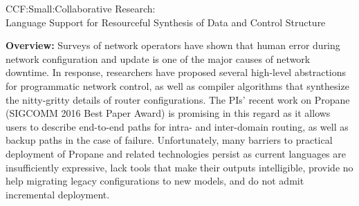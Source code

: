 \documentclass[12pt]{article}
\makeatletter
\newcommand{\Propane}{{\sc Propane}\@\xspace}
\makeatother
\begin{document}
\setcounter{page}{1}

 \begin{large}
\begin{center}
CCF:Small:Collaborative Research: \\
Language Support for Resourceful Synthesis of Data and Control Structure
\end{center}
\end{large}

\noindent
\textbf{Overview:} 
Surveys of network operators have shown that human error during
network configuration and update is one of the major causes of network
downtime.  
In response, researchers have proposed several
high-level abstractions for programmatic network control, as well
as compiler algorithms that synthesize the nitty-gritty details
of router configurations.  The PIs' recent work on \Propane 
(SIGCOMM 2016 Best Paper Award) is promising in this regard
as it allows users to describe end-to-end paths for intra- and
inter-domain routing, as well as backup paths in the case of 
failure.  Unfortunately, many barriers to practical deployment of \Propane
and related technologies persist as current languages are insufficiently
expressive, lack tools that make their outputs intelligible, 
provide no help migrating legacy configurations to new models, and
do not admit incremental deployment.
\end{document}
